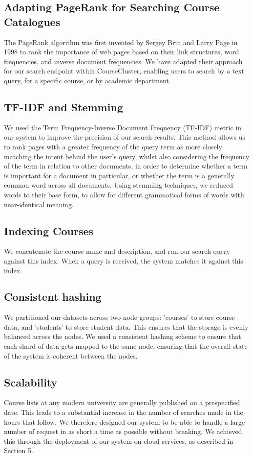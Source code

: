\documentclass[sigplan, screen, 10pt]{acmart}
\begin{document}
\subsection{Adapting PageRank for Searching Course Catalogues}
The PageRank algorithm was first invented by Sergey Brin and Larry Page in 1998 to rank the importance of web pages based on their link structures, word frequencies, and inverse document frequencies. We have adapted their approach for our search endpoint within CourseCluster, enabling users to search by a text query, for a specific course, or by academic department.

\subsection{TF-IDF and Stemming}
We used the Term Frequency-Inverse Document Frequency (TF-IDF) metric in our system to improve the precision of our search results. This method allows us to rank pages with a greater frequency of the query term as more closely matching the intent behind the user's query, whilst also considering the frequency of the term in relation to other documents, in order to determine whether a term is important for a document in particular, or whether the term is a generally common word across all documents. Using stemming techniques, we reduced words to their base form, to allow for different grammatical forms of words with near-identical meaning.

\subsection{Indexing Courses}
We concatenate the course name and description, and run our search query against this index. When a query is received, the system matches it against this index.

\subsection{Consistent hashing}
We partitioned our datasets across two node groups: 'courses' to store course data, and 'students' to store student data. This ensures that the storage is evenly balanced across the nodes. We used a consistent hashing scheme to ensure that each shard of data gets mapped to the same node, ensuring that the overall state of the system is coherent between the nodes.

\subsection{Scalability}
Course lists at any modern university are generally published on a prespecified date. This leads to a substantial increase in the number of searches made in the hours that follow. We therefore designed our system to be able to handle a large number of request in as short a time as possible without breaking. We achieved this through the deployment of our system on cloud services, as described in Section 5.
\end{document}
